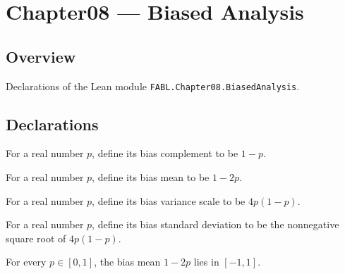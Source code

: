 \chapter{Chapter08 — Biased Analysis}
\section{Overview}

Declarations of the Lean module \texttt{FABL.Chapter08.BiasedAnalysis}.

\section{Declarations}

\begin{definition}
\label{FABL.biasComplement}
\leanok
For a real number $p$, define its bias complement to be $1-p$.
\end{definition}

\begin{definition}
\label{FABL.biasMean}
\leanok
For a real number $p$, define its bias mean to be $1-2p$.
\end{definition}

\begin{definition}
\label{FABL.biasVarianceScale}
\leanok
For a real number $p$, define its bias variance scale to be $4p(1-p)$.
\end{definition}

\begin{definition}
\label{FABL.biasSigma}
\leanok
{}
For a real number $p$, define its bias standard deviation to be the nonnegative square
root of $4p(1-p)$.
\end{definition}

\begin{theorem}
\label{FABL.biasMean_mem_Icc}
\leanok
{}
For every $p\in[0,1]$, the bias mean $1-2p$ lies in $[-1,1]$.
\end{theorem}

